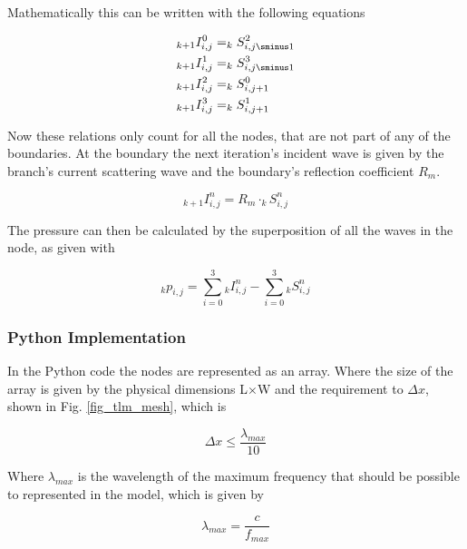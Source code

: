 \documentclass[twocolumn]{article}
\begin{document}
Mathematically this can be written with the following equations

\begin{equation}
\begin{aligned}
    _{k+1}I_{i,j}^{0} &= _{k}S_{i,j\sminus 1}^{2} \\
    _{k+1}I_{i,j}^{1} &= _{k}S_{i,j\sminus 1}^{3} \\
    _{k+1}I_{i,j}^{2} &= _{k}S_{i,j+1}^{0} \\
    _{k+1}I_{i,j}^{3} &= _{k}S_{i,j+1}^{1} \\
\end{aligned}
\label{eq_propagation}
\end{equation}

Now these relations only count for all the nodes, that are not part of any of the boundaries.
At the boundary the next iteration's incident wave is given by the branch's current
scattering wave and the boundary's reflection coefficient $R_{m}$.

\begin{equation}
    _{k+1}I_{i,j}^{n} = R_{m}\cdot _{k}S_{i,j}^{n}
    \label{eq_boundary_propagation}
\end{equation}

The pressure can then be calculated by the superposition of all the waves in the node,
as given with

\begin{equation}
    _{k}p_{i,j} = \sum_{i=0}^{3} {}_kI_{i,j}^{n} - \sum_{i=0}^{3} {}_kS_{i,j}^{n}
\end{equation}

\subsubsection{Python Implementation}
In the Python code the nodes are represented as an array.
Where the size of the array is given by the physical dimensions L$\times$W and
the requirement to $\Delta x$, shown in Fig. \ref{fig_tlm_mesh}, which is

\begin{equation}
    \Delta x \leq \frac{\lambda_{max}}{10}
    \label{eq_delta_x}
\end{equation}

Where $\lambda_{max}$ is the wavelength of the maximum frequency that should be possible
to represented in the model, which is given by

\begin{equation}
    \lambda_{max} = \frac{c}{f_{max}}
    \label{eq_max_wavelength}
\end{equation}
\end{document}
